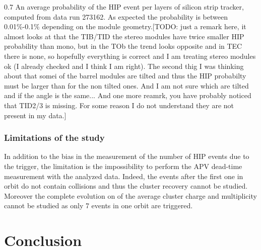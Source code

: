

                 {0.7}       %
                 {An average probability of the HIP event per layers of silicon strip tracker, computed from data run 273162. As expected the probability is between 0.01\%-0.1\% depending on the module geometry.[TODO: just a remark here, it almost looks at that the TIB/TID the stereo modules have twice smaller HIP probability than mono, but in the TOb the trend looks opposite and in TEC there is none, so hopefully everything is correct and I am treating stereo modules ok (I already checked and I think I am right). The second thig I was thinking about that somei of the barrel modules are tilted and thus the HIP probabilty must be larger than for the non tilted ones. And I am not sure which are tilted and if the angle is the same... And one more reamrk, you have probably noticed that TID2/3 is missing. For some reason I do not understand they are not present in my data.]  } %

\subsubsection{Limitations of the study}
 
In addition to the bias in the measurement of the number of HIP events due to the trigger, the limitation is the impossibility to perform the APV dead-time measurement with the analyzed data. Indeed, the events after the first one in orbit do not contain collisions and thus the cluster recovery cannot be studied. Moreover the complete evolution on of the average cluster charge and multiplicity cannot be studied as only 7 events in one orbit are triggered. 

\section{Conclusion}

